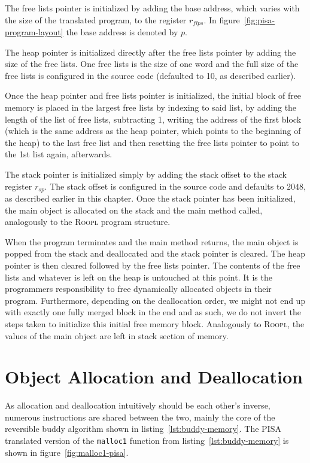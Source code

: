 The free lists pointer is initialized by adding the base address, which varies with the size of the translated program, to the register $r_{flps}$. In figure~\ref{fig:pisa-program-layout} the base address is denoted by $p$.

The heap pointer is initialized directly after the free lists pointer by adding the size of the free lists. One free lists is the size of one word and the full size of the free lists is configured in the source code (defaulted to 10, as described earlier).

Once the heap pointer and free lists pointer is initialized, the initial block of free memory is placed in the largest free lists by indexing to said list, by adding the length of the list of free lists, subtracting 1, writing the address of the first block (which is the same address as the heap pointer, which points to the beginning of the heap) to the last free list and then resetting the free lists pointer to point to the 1st list again, afterwards.

The stack pointer is initialized simply by adding the stack offset to the stack register $r_{sp}$. The stack offset is configured in the source code and defaults to $2048$, as described earlier in this chapter. Once the stack pointer has been initialized, the main object is allocated on the stack and the main method called, analogously to the \textsc{Roopl} program structure.

When the program terminates and the main method returns, the main object is popped from the stack and deallocated and the stack pointer is cleared. The heap pointer is then cleared followed by the free lists pointer. The contents of the free lists and whatever is left on the heap is untouched at this point. It is the programmers responsibility to free dynamically allocated objects in their \rooplpp program. Furthermore, depending on the deallocation order, we might not end up with exactly one fully merged block in the end and as such, we do not invert the steps taken to initialize this initial free memory block.
Analogously to \textsc{Roopl}, the values of the main object are left in stack section of memory.


\section{Object Allocation and Deallocation}
\label{sec:object-allocation-deallocation}
As allocation and deallocation intuitively should be each other's inverse, numerous instructions are shared between the two, mainly the core of the reversible buddy algorithm shown in listing~\ref{lst:buddy-memory}. The PISA translated version of the \texttt{malloc1} function from listing~\ref{lst:buddy-memory} is shown in figure~\ref{fig:malloc1-pisa}.

